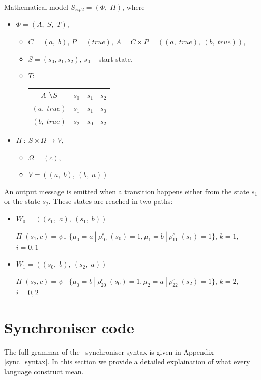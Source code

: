 \begin{enumerate}
Mathematical model $S_{zip2} = (\Phi, \; \Pi)$, where
  \begin{itemize}
  \item[] $\Phi = (A, \; S, \; T)$,
    \begin{itemize}
    \item[] $C = (a, \; b)$, $P = (true)$, $A = C \times P = ((a, \; true), \: (b, \; true))$,
    \item[] $S = (s_{0}, s_{1}, s_{2})$, $s_{0}$ -- start state,
    \item[] $T$:
      \begin{tabular}{c|c|c|c}
      $A$ \textbackslash $S$ & $s_{0}$ & $s_{1}$ & $s_{2}$\\
      \hline
      $(a, \; true)$ & $s_{1}$ & $s_{1}$ & $s_{0}$\\
      \hline
      $(b, \; true)$ & $s_{2}$ & $s_{0}$ & $s_{2}$\\
      \end{tabular}
    \end{itemize}
  \item[] $\Pi \: : \: S \times \Omega \to V$,
    \begin{itemize}
    \item[] $\Omega = (c)$,
    \item[] $V = ((a, \; b), \: (b, \; a))$
    \end{itemize}
  \end{itemize}

An output message is emitted when a transition happens either from the state $s_{1}$ or the state $s_{2}$. These states are reached in two paths:
  \begin{itemize}
  \item[]
$W_{0} = ((s_{0}, \; a), \: (s_{1}, \; b))$

$\Pi \; (s_{1}, c) = \psi_{\sqcap} \; \{\mu_{0} = a \: | \: \rho_{10}^{c} \; (s_{0}) = 1, \mu_{1} = b \: | \: \rho_{11}^{c} \; (s_{1}) = 1\}$, $k = 1$, $i = 0,1$
  \item[]
$W_{1} = ((s_{0}, \; b), \: (s_{2}, \; a))$

$\Pi \; (s_{2}, c) = \psi_{\sqcap} \; \{\mu_{0} = b \: | \: \rho_{20}^{c} \; (s_{0}) = 1, \mu_{2} = a \: | \: \rho_{22}^{c} \; (s_{2}) = 1\}$, $k = 2$, $i = 0,2$ 
  \end{itemize}
  \end{enumerate}


\section{Synchroniser code}
The full grammar of the \ak\ synchroniser syntax is given in Appendix \ref{sync_syntax}. In this section we provide a detailed explaination of what every language construct mean.

